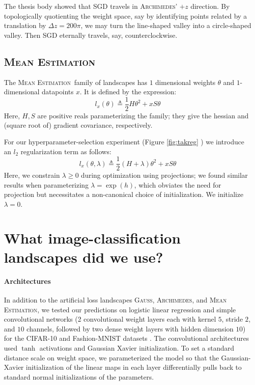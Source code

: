\documentclass[openany, notitlepage, justified]{tufte-book}
\newcommand{\ofthree}[1]{
    {\tiny \raisebox{0.04cm}{$
        \ifthenelse{\equal{#1}{0}}{{\color{moor}\blacksquare}}{\square}
        \ifthenelse{\equal{#1}{1}}{{\color{moor}\blacksquare}}{\square}    
        \ifthenelse{\equal{#1}{2}}{{\color{moor}\blacksquare}}{\square}
    $}}%
}
\theoremstyle{plain}
\theoremstyle{definition}
\newcommand{\Gauss}{\textsc{Gauss}}
\newcommand{\Archimedes}{\textsc{Archimedes}}
\newcommand{\MeanEstimation}{\textsc{Mean Estimation}}
\begin{document}
            The thesis body showed that SGD travels in \Archimedes' $+z$
            direction.  By topologically quotienting the weight space, say by
            identifying points related by a translation by $\Delta z = 200\pi$,
            we may turn the line-shaped valley into a circle-shaped valley.
            Then SGD eternally travels, say, counterclockwise.
           
        \subsection{\MeanEstimation}
            The \MeanEstimation\, family of landscapes has $1$ dimensional
            weights $\theta$ and $1$-dimensional datapoints $x$.  It is defined
            by the expression:
            $$
                l_x(\theta)
                \triangleq
                \frac{1}{2} H \theta^2 + x S \theta
            $$
            Here, $H, S$ are positive reals parameterizing the family; they
            give the hessian and (square root of) gradient covariance,
            respectively.

            For our hyperparameter-selection experiment (Figure
            \ref{fig:takreg}\ofthree{2}) we introduce an $l_2$
            regularization term as follows:
            $$
                l_x(\theta, \lambda)
                \triangleq
                \frac{1}{2} (H + \lambda) \theta^2 + x S \theta
            $$
            Here, we constrain $\lambda\geq 0$ during optimization using
            projections; we found similar results when parameterizing $\lambda
            = \exp(h)$, which obviates the need for projection but necessitates
            a non-canonical choice of initialization.  We initialize
            $\lambda=0$.

    \section{What image-classification landscapes did we use?}   \label{appendix:natural}

        \paragraph{Architectures}
            In addition to the artificial loss landscapes
            \Gauss, \Archimedes, and \MeanEstimation, 
            we tested our predictions on logistic linear regression
            and simple convolutional networks (2 convolutional weight layers
            each with kernel $5$, stride $2$, and $10$ channels, followed by
            two dense weight layers with hidden dimension $10$) for the
            CIFAR-10 \citep{kr09} and Fashion-MNIST datasets \citep{xi17}.  The
            convolutional architectures used $\tanh$ activations and Gaussian
            Xavier initialization.  To set a standard distance scale on weight
            space, we parameterized the model so that the
            Gaussian-Xavier initialization of the linear maps in each layer
            differentially pulls back to standard normal initializations of the
            parameters.
            
\end{document}
